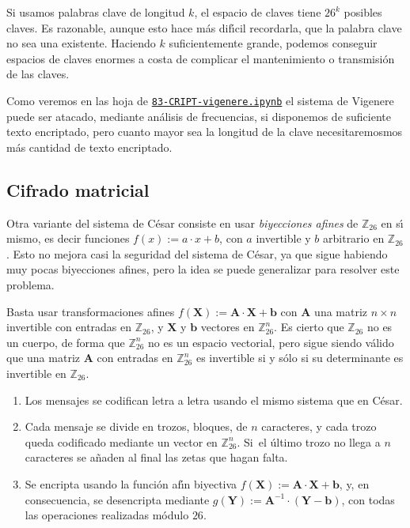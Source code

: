 Si usamos palabras clave de longitud $k$, el espacio de claves tiene $26^k$
posibles claves. Es razonable, aunque esto hace m\'as
dif\'{\i}cil recordarla,  que la palabra clave no sea una existente. Haciendo
$k$ suficientemente grande, podemos conseguir espacios de claves enormes a costa
de complicar el mantenimiento o transmisi\'on de las claves. 

Como veremos en las hoja de {\sage}
\href{http://localhost:8888/notebooks/CRIPT/83-CRIPT-vigenere.ipynb}{\tt 83-CRIPT-vigenere.ipynb}
el sistema de  Vigenere puede ser atacado, mediante an\'alisis de frecuencias, 
si disponemos de suficiente texto encriptado, pero cuanto  mayor sea la 
longitud 
de la clave 
necesitaremosmos m\'as cantidad de texto encriptado.




\subsection{Cifrado matricial}


Otra variante del sistema de C\'esar consiste en usar {\itshape biyecciones
afines} de $\mathbb{Z}_{26}$ en s\'{\i} mismo, es decir funciones $f(x):=a\cdot
x +b$, con $a$ invertible y $b$ arbitrario en $\mathbb{Z}_{26}$.  Esto no mejora
casi la seguridad del sistema de C\'esar, ya que sigue habiendo muy pocas
biyecciones afines, pero la idea se puede generalizar para resolver este
problema. 

Basta usar transformaciones afines $f(\mathbf{X}):=\mathbf{A}\cdot
\mathbf{X} +\mathbf{b}$ con $\mathbf{A}$ una matriz $n\times n$ invertible con
entradas en $\mathbb{Z}_{26}$, y $\mathbf{X}$ y $\mathbf{b}$ vectores en
$\mathbb{Z}_{26}^n$. Es cierto que $\mathbb{Z}_{26}$ no es un cuerpo, de forma 
que
$\mathbb{Z}_{26}^n$ no es un espacio vectorial, pero sigue siendo v\'alido que 
una
matriz $\mathbf{A}$ con entradas en 
 $\mathbb{Z}_{26}^n$ es invertible si y s\'olo si su determinante es invertible en $\mathbb{Z}_{26}.$

\begin{enumerate}
 \item Los mensajes se codifican letra a letra usando el mismo sistema que en
C\'esar.
 \item Cada mensaje se divide en trozos, bloques,  de $n$ caracteres, y cada
trozo queda codificado mediante un vector en $\mathbb{Z}_{26}^n$. Si~el \'ultimo
trozo no llega a $n$ caracteres se a\~naden al final las zetas que hagan falta.

\item Se encripta usando la funci\'on af\'{\i}n biyectiva
$f(\mathbf{X}):=\mathbf{A}\cdot
\mathbf{X} +\mathbf{b}$, y, en consecuencia, se desencripta mediante
$g(\mathbf{Y}):=\mathbf{A}^{-1}\cdot(
\mathbf{Y} -\mathbf{b})$, con todas las operaciones realizadas m\'odulo $26$.
 \end{enumerate}

